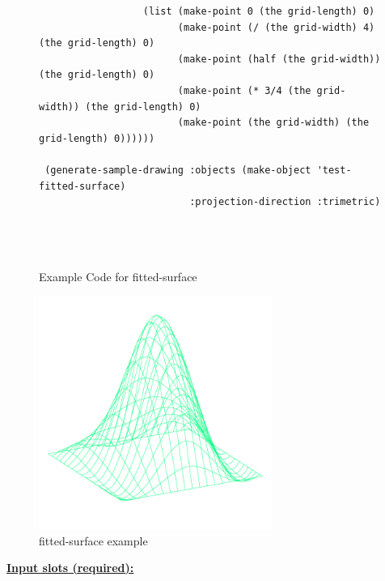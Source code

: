 \documentclass [11pt]{book}
\begin{document}
\begin{itemize}
\begin{figure}
\begin{lrbox}{\boxedverb}
\begin{minipage}{\linewidth}
{\begin{verbatim}
                  (list (make-point 0 (the grid-length) 0)
                        (make-point (/ (the grid-width) 4) (the grid-length) 0)
                        (make-point (half (the grid-width)) (the grid-length) 0)
                        (make-point (* 3/4 (the grid-width)) (the grid-length) 0)
                        (make-point (the grid-width) (the grid-length) 0))))))

 (generate-sample-drawing :objects (make-object 'test-fitted-surface)
                          :projection-direction :trimetric)


 
\end{verbatim}}
\end{minipage}
\end{lrbox}
\fbox{\usebox{\boxedverb}}

\caption{Example Code for fitted-surface}

\label{fig:example-code-fitted-surface}

\end{figure}

\begin{figure}
\begin{center}
\includegraphics[width=3in,height=3in]{../images/example-fitted-surface.pdf}
\end{center}

\caption{fitted-surface example}

\label{fig:fitted-surface}

\end{figure}





\textbf{
\underline{Input slots (required):}}

\begin{description}


\end{description}
\end{itemize}
\end{document}
